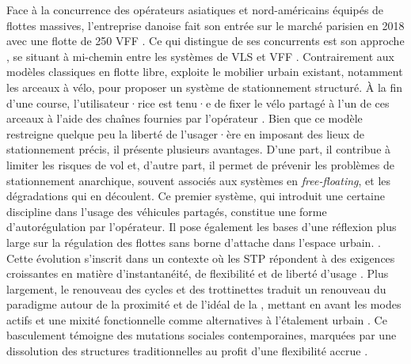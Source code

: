 \begin{refsegment}
{    Face à la concurrence des opérateurs asiatiques et nord-américains équipés de flottes massives, l’entreprise danoise  fait son entrée sur le marché parisien en 2018 avec une flotte de 250 \acrshort{VFF} \textcolor{blue}{\autocite[20]{6t-bureau_de_recherche_etude_2018}}. Ce qui distingue  de ses concurrents est son approche , se situant à mi-chemin entre les systèmes de \acrshort{VLS} et \acrshort{VFF} \textcolor{blue}{\autocite[20]{6t-bureau_de_recherche_etude_2018}}. Contrairement aux modèles classiques en flotte libre,  exploite le mobilier urbain existant, notamment les arceaux à vélo, pour proposer un système de stationnement structuré. À la fin d’une course, l’utilisateur·rice est tenu·e de fixer le vélo partagé à l’un de ces arceaux à l’aide des chaînes fournies par l’opérateur \textcolor{blue}{\autocite[20]{6t-bureau_de_recherche_etude_2018}}. Bien que ce modèle restreigne quelque peu la liberté de l’usager·ère en imposant des lieux de stationnement précis, il présente plusieurs avantages. D’une part, il contribue à limiter les risques de vol et, d’autre part, il permet de prévenir les problèmes de stationnement anarchique, souvent associés aux systèmes en \textsl{free-floating}, et les dégradations qui en découlent. Ce premier système, qui introduit une certaine discipline dans l’usage des véhicules partagés, constitue une forme d’autorégulation par l’opérateur. Il pose également les bases d’une réflexion plus large sur la régulation des flottes sans borne d'attache dans l’espace urbain.
}. Cette évolution s’inscrit dans un contexte où les \acrshort{STP} répondent à des exigences croissantes en matière d’instantanéité, de flexibilité et de liberté d’usage \textcolor{blue}{\autocite[8]{frere_services_2018}}. Plus largement, le renouveau des cycles et des trottinettes traduit un renouveau du paradigme autour de la proximité et de l'idéal de la , mettant en avant les modes actifs et une mixité fonctionnelle comme alternatives à l’étalement urbain \textcolor{blue}{\autocite[44]{eskenazi_voir_2022}}. Ce basculement témoigne des mutations sociales contemporaines, marquées par une dissolution des structures traditionnelles au profit d'une flexibilité accrue \textcolor{blue}{\autocite[130-142]{bauman_liquid_2000}}.%


\end{refsegment}
